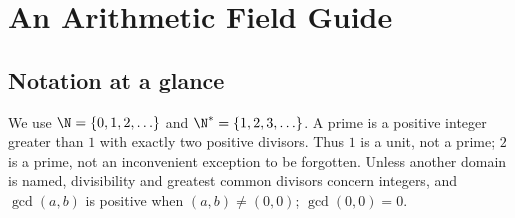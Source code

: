\chapter*{An Arithmetic Field Guide}

\section*{Notation at a glance}
We use $\N=\{0,1,2,\ldots\}$ and $\N^*=\{1,2,3,\ldots\}$. A prime is a positive integer greater than $1$
with exactly two positive divisors. Thus $1$ is a unit, not a prime; $2$ is a prime, not an inconvenient exception
to be forgotten. Unless another domain is named, divisibility and greatest common divisors concern integers,
and $\gcd(a,b)$ is positive when $(a,b)\ne(0,0)$; $\gcd(0,0)=0$.


